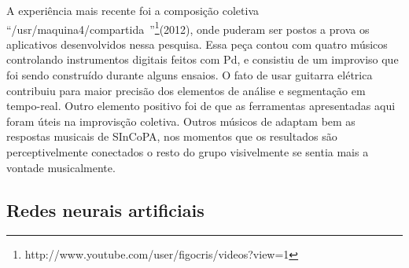 \documentclass{ppgmus}
\begin{document}
A experiência mais recente foi a composição coletiva ``/usr/maquina4/compartida~''\footnote
{http://www.youtube.com/user/figocris/videos?view=1}(2012), onde puderam
ser postos a prova os aplicativos desenvolvidos nessa pesquisa. Essa peça contou com quatro
músicos controlando instrumentos digitais feitos com Pd, e consistiu de um improviso que foi
sendo construído durante alguns ensaios. O fato de usar guitarra elétrica
contribuiu para maior precisão dos elementos de análise e segmentação em tempo-real.
Outro elemento positivo foi de que as ferramentas apresentadas aqui foram úteis na 
improvisção coletiva. Outros músicos de adaptam bem as respostas musicais de SInCoPA, nos momentos que 
os resultados são perceptivelmente conectados o resto do grupo visivelmente se sentia mais
a vontade musicalmente.


\subsection{Redes neurais artificiais}


\end{document}
